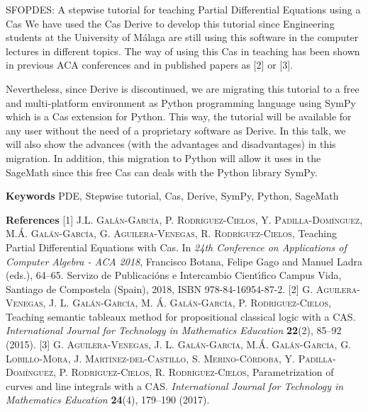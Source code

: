 \begin{abstract_online}{SFOPDES: A stepwise tutorial for teaching Partial Differential Equations using a {\sc Cas}}
We have used the {\sc Cas Derive} to develop this tutorial since Engineering students at the University of M\'alaga are still using this software in the computer lectures in different topics. The way of using this {\sc Cas} in teaching has been shown in previous ACA conferences and in published papers as [2] or [3]. 

Nevertheless, since {\sc Derive} is discontinued, we are migrating this tutorial to a free and multi-platform environment as {\sc Python} programming language using {\sc SymPy} which is a {\sc Cas} extension for {\sc Python}. This way, the tutorial will be available for any user without the need of a proprietary software as {\sc Derive}. In this talk, we will also show the advances (with the advantages and disadvantages) in this migration. In addition, this migration to {\sc Python} will allow it uses in the {\sc SageMath} since this free {\sc Cas} can deals with the {\sc Python} library {\sc SymPy}.

\textbf{Keywords} \newline{} PDE, Stepwise tutorial, {\sc Cas}, {\sc Derive}, {\sc SymPy}, {\sc Python}, {\sc SageMath}

\textbf{References} \newline{}
[1] \textsc{J.L. Gal\'an-Garc\'{\i}a, P. Rodr\'{\i}guez-Cielos, Y. Padilla-Dom\'{\i}nguez, M.\'A. Gal\'an-Garc\'{\i}a, G. Aguilera-Venegas, R. Rodr\'{\i}guez-Cielos}, Teaching Partial Differential Equations with {\sc Cas}. In \emph{24th Conference on Applications of Computer Algebra - ACA 2018}, Francisco Botana, Felipe Gago and Manuel Ladra (eds.), 64--65. Servizo de Publicaci\'ons e Intercambio Cient\'{\i}fico Campus Vida, Santiago de Compostela (Spain), 2018, ISBN 978-84-16954-87-2. \newline{}
[2] \textsc{G. Aguilera-Venegas, J. L. Gal\'an-Garc\'{\i}a, M. \'A. Gal\'an-Garc\'{\i}a, P. Rodr\'{\i}guez-Cielos}, Teaching semantic tableaux method for propositional classical logic with a CAS. \emph{International Journal for Technology in Mathematics Education} \textbf{22}(2), 85--92  (2015). \newline{}
[3] \textsc{G. Aguilera-Venegas, J. L. Gal\'an-Garc\'{\i}a, M.\'A. Gal\'an-Garc\'{\i}a, G. Lobillo-Mora, J.  Mart\'{\i}nez-del-Castillo, S. Merino-C\'ordoba, Y. Padilla-Dom\'{\i}nguez, P. Rodr\'{\i}guez-Cielos, R. Rodr\'{\i}guez-Cielos}, Parametrization of curves and line integrals with a CAS. \emph{International Journal for Technology in Mathematics Education} \textbf{24}(4), 179--190  (2017). \newline{}
\end{abstract_online}
    